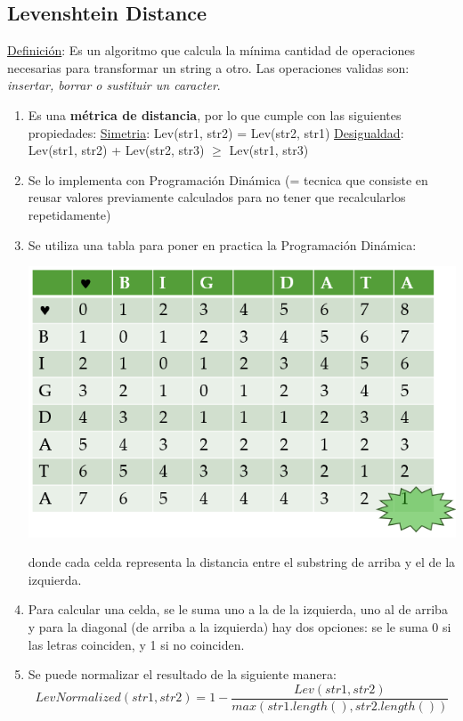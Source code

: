 \documentclass{article}
\begin{document}
\subsection{Levenshtein Distance}
\underline{Definición}: Es un algoritmo que calcula la mínima cantidad de operaciones necesarias para transformar un string a otro. Las operaciones validas son: \emph{insertar, borrar o sustituir un caracter}.

\begin{enumerate}
    \item Es una \textbf{métrica de distancia}, por lo que cumple con las siguientes propiedades:
        \subitem \underline{Simetria}: Lev(str1, str2) = Lev(str2, str1)
        \subitem \underline{Desigualdad}: Lev(str1, str2) + Lev(str2, str3) $\geq$ Lev(str1, str3)
    \item Se lo implementa con Programación Dinámica (= tecnica que consiste en reusar valores previamente calculados para no tener que recalcularlos repetidamente)
    \item Se utiliza una tabla para poner en practica la Programación Dinámica:
    \begin{center}
        \includegraphics[width=.60\textwidth]{Images/LevenshteinTable.png}
    \end{center}
    donde cada celda representa la distancia entre el substring de arriba y el de la izquierda.
    \item Para calcular una celda, se le suma uno a la de la izquierda, uno al de arriba y para la diagonal (de arriba a la izquierda) hay dos opciones: se le suma 0 si las letras coinciden, y 1 si no coinciden.
    \item Se puede normalizar el resultado de la siguiente manera:
    \begin{equation*}
        LevNormalized(str1, str2) = 1 - \frac{Lev(str1, str2)}{max(str1.length(), str2.length())}
    \end{equation*}
\end{enumerate}
\end{document}
